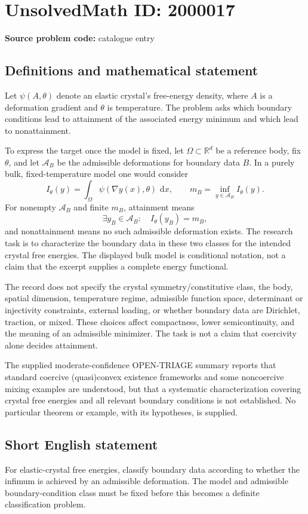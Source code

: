 \documentclass[11pt]{article}
\newcommand{\R}{\mathbb{R}}
\newcommand{\dd}{\,\mathrm{d}}
\begin{document}
\section*{UnsolvedMath ID: 2000017}
\textbf{Source problem code:} catalogue entry
\subsection{Definitions and mathematical statement}
Let \(\psi(A,\theta)\) denote an elastic crystal's free-energy density, where \(A\) is a deformation gradient and \(\theta\) is temperature. The problem asks which boundary conditions lead to attainment of the associated energy minimum and which lead to nonattainment.

To express the target once the model is fixed, let \(\Omega\subset\R^d\) be a reference body, fix \(\theta\), and let \(\mathcal A_B\) be the admissible deformations for boundary data \(B\). In a purely bulk, fixed-temperature model one would consider
\[
I_\theta(y)=\int_\Omega\psi(\nabla y(x),\theta)\,\dd x,
\qquad m_B=\inf_{y\in\mathcal A_B}I_\theta(y).
\]
For nonempty \(\mathcal A_B\) and finite \(m_B\), attainment means
\[
\exists y_B\in\mathcal A_B:\quad I_\theta(y_B)=m_B,
\]
and nonattainment means no such admissible deformation exists. The research task is to characterize the boundary data in these two classes for the intended crystal free energies. The displayed bulk model is conditional notation, not a claim that the excerpt supplies a complete energy functional.

The record does not specify the crystal symmetry/constitutive class, the body, spatial dimension, temperature regime, admissible function space, determinant or injectivity constraints, external loading, or whether boundary data are Dirichlet, traction, or mixed. These choices affect compactness, lower semicontinuity, and the meaning of an admissible minimizer. The task is not a claim that coercivity alone decides attainment.

The supplied moderate-confidence OPEN-TRIAGE summary reports that standard coercive (quasi)convex existence frameworks and some noncoercive mixing examples are understood, but that a systematic characterization covering crystal free energies and all relevant boundary conditions is not established. No particular theorem or example, with its hypotheses, is supplied.
\subsection{Short English statement}
For elastic-crystal free energies, classify boundary data according to whether the infimum is achieved by an admissible deformation. The model and admissible boundary-condition class must be fixed before this becomes a definite classification problem.
\end{document}
